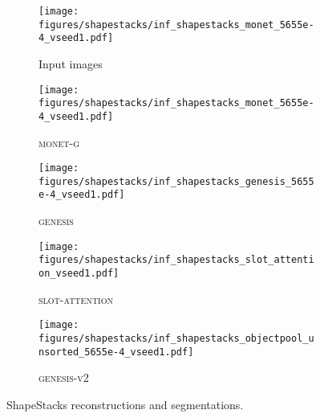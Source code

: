 \documentclass{article}
\begin{document}
\begin{figure}[h!]
	\centering
	\begin{subfigure}{\linewidth}
		\texttt{[image: figures/shapestacks/inf\_shapestacks\_monet\_5655e-4\_vseed1.pdf]}
		\caption{Input images}
		\vspace{6pt}
	\end{subfigure}
	\begin{subfigure}{\linewidth}
		\texttt{[image: figures/shapestacks/inf\_shapestacks\_monet\_5655e-4\_vseed1.pdf]}
		\caption{\textsc{monet-g}}
		\vspace{6pt}
	\end{subfigure}
	\begin{subfigure}{\linewidth}
		\texttt{[image: figures/shapestacks/inf\_shapestacks\_genesis\_5655e-4\_vseed1.pdf]}
		\caption{\textsc{genesis}}
		\vspace{6pt}
	\end{subfigure}
	\begin{subfigure}{\linewidth}
		\texttt{[image: figures/shapestacks/inf\_shapestacks\_slot\_attention\_vseed1.pdf]}
		\caption{\textsc{slot-attention}}
		\vspace{6pt}
	\end{subfigure}
	\begin{subfigure}{\linewidth}
        \texttt{[image: figures/shapestacks/inf\_shapestacks\_objectpool\_unsorted\_5655e-4\_vseed1.pdf]}
		\caption{\textsc{genesis-v2}}
	\end{subfigure}
	\caption{ShapeStacks reconstructions and segmentations.}
\end{figure}
\end{document}
